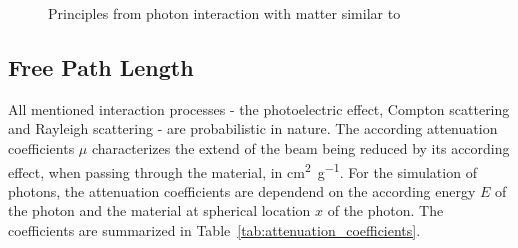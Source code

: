 \begin{figure}
    \caption{Principles from photon interaction with matter similar to \cite[Chap. 7]{medicalImagingSystemsIntro2019:}}
    \label{fig:tungsten_atomic_model}
\end{figure}

\subsection{Free Path Length}

All mentioned interaction processes - the photoelectric effect, Compton
scattering and Rayleigh scattering - are probabilistic in nature. The according
attenuation coefficients $\mu$ characterizes the extend of the beam being
reduced by its according effect, when passing through the material, in \si{\square\centi\metre\per\gram}. For the
simulation of photons, the attenuation coefficients are dependend on the
according energy $E$ of the photon and the material at spherical location $x$ of
the photon. The coefficients are summarized in
Table~\ref{tab:attenuation_coefficients}.

